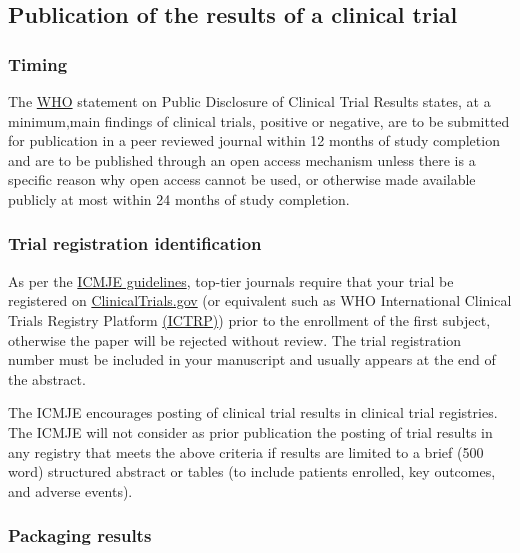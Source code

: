 \documentclass[]{book}
\theoremstyle{definition}
\theoremstyle{definition}
\theoremstyle{definition}
\theoremstyle{remark}
\begin{document}
\subsection{Publication of the results of a clinical
trial}\label{publication-of-the-results-of-a-clinical-trial}

\subsubsection{Timing}\label{timing}

The \href{http://www.who.int/ictrp/results/reporting/en/}{WHO} statement
on Public Disclosure of Clinical Trial Results states, at a minimum,main
findings of clinical trials, positive or negative, are to be submitted
for publication in a peer reviewed journal within 12 months of study
completion and are to be published through an open access mechanism
unless there is a specific reason why open access cannot be used, or
otherwise made available publicly at most within 24 months of study
completion.

\subsubsection{Trial registration
identification}\label{trial-registration-identification}

As per the
\href{http://www.icmje.org/recommendations/browse/manuscript-preparation/preparing-for-submission.html}{ICMJE
guidelines}, top-tier journals require that your trial be registered on
\href{https://clinicaltrials.gov/}{ClinicalTrials.gov} (or equivalent
such as WHO International Clinical Trials Registry Platform
\href{http://www.who.int/ictrp/network/primary/en/index.html}{(ICTRP)})
prior to the enrollment of the first subject, otherwise the paper will
be rejected without review. The trial registration number must be
included in your manuscript and usually appears at the end of the
abstract.

The ICMJE encourages posting of clinical trial results in clinical trial
registries. The ICMJE will not consider as prior publication the posting
of trial results in any registry that meets the above criteria if
results are limited to a brief (500 word) structured abstract or tables
(to include patients enrolled, key outcomes, and adverse events).

\subsubsection{Packaging results}\label{packaging-results}
\end{document}
